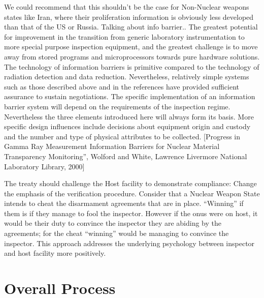 \documentclass[twoside,titlepage,11pt,twocolumn,a4paper]{article}
\begin{document}
We could recommend that this shouldn't be the case for Non-Nuclear
weapons states like Iran, where their proliferation information is
obviously less developed than that of the US or Russia.  Talking about
info barrier.. The greatest potential for improvement in the
transition from generic laboratory instrumentation to more special
purpose inspection equipment, and the greatest challenge is to move
away from stored programs and microprocessors towards pure hardware
solutions.  The technology of information barriers is primitive
compared to the technology of radiation detection and data
reduction. Nevertheless, relatively simple systems such as those
described above and in the references have provided sufficient
assurance to sustain negotiations. The specific implementation of an
information barrier system will depend on the requirements of the
inspection regime. Nevertheless the three elements introduced here
will always form its basis. More specific design influences include
decisions about equipment origin and custody and the number and type
of physical attributes to be collected.  [Progress in Gamma Ray
  Measurement Information Barriers for Nuclear Material Transparency
  Monitoring'', Wolford and White, Lawrence Livermore National
  Laboratory Library, 2000]

The treaty should challenge the Host facility to demonstrate
compliance: Change the emphasis of the verification
procedure. Consider that a Nuclear Weapon State intends to cheat the
disarmament agreements that are in place.  ``Winning'' if them is if
they manage to fool the inspector. However if the onus were on host,
it would be their duty to convince the inspector they are abiding by
the agreements; for the cheat ``winning'' would be managing to
convince the inspector. This approach addresses the underlying
psychology between inspector and host facility more positively.

\section{Overall Process}
\end{document}
